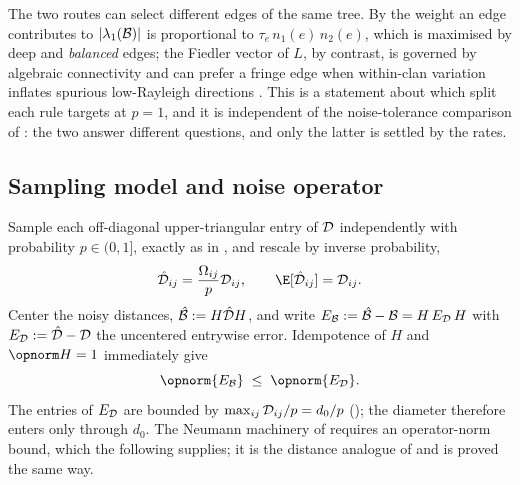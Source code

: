 \begin{remark}\label{rem:dist-compare-empirical}
The two routes can select different edges of the same tree. By
 the weight an edge contributes to $|\lambda_1(\mathcal{B})|$ is
proportional to $\tau_e\,n_1(e)\,n_2(e)$, which is maximised by deep and
\emph{balanced} edges; the Fiedler vector of $L$, by contrast, is governed by
algebraic connectivity and can prefer a fringe edge when within-clan variation
inflates spurious low-Rayleigh directions
\cite[Thm.~4.2]{aizenbud2023spectral}. This is a statement about which split each
rule targets at $p=1$, and it is independent of the noise-tolerance comparison of
: the two answer different questions, and only the latter is
settled by the rates.
\end{remark}

\subsection{Sampling model and noise operator}\label{app:dist-noise}

Sample each off-diagonal upper-triangular entry of $\mathcal{D}$ independently with
probability $p\in(0,1]$, exactly as in , and rescale by
inverse probability,
\begin{equation}\label{eq:dist-ipw}
   \hat\Dmat_{ij} = \frac{\Omega_{ij}}{p}\Dmat_{ij}, \qquad \E[\hat\Dmat_{ij}]=\Dmat_{ij}.
\end{equation}
Center the noisy distances, $\hat{\mathcal{B}}:=H\hat{\mathcal{D}} H$, and write
$E_{\mathcal{B}}:=\hat{\mathcal{B}}-\mathcal{B}=H\,E_{\mathcal{D}}\,H$ with $E_{\mathcal{D}}:=\hat{\mathcal{D}}-\mathcal{D}$
the uncentered entrywise error. Idempotence of $H$ and $\opnorm H=1$ immediately
give
\begin{equation}\label{eq:dist-EB}
   \opnorm{E_{\Bop}} \;\le\; \opnorm{E_{\Dmat}}.
\end{equation}
The entries of $E_{\mathcal{D}}$ are bounded by $\max_{ij}\mathcal{D}_{ij}/p=d_0/p$
(); the diameter therefore enters only through $d_0$.
The Neumann machinery of  requires an operator-norm bound, which
the following supplies; it is the distance analogue of  and
is proved the same way.

